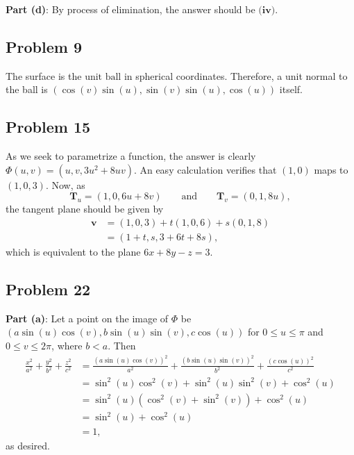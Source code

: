 \documentclass[11pt]{article}
\renewcommand{\vec}[1]{\mathbf{#1}}
\begin{document}
\textbf{Part (d)}: By process of elimination, the answer should be $\boxed{\textbf{(iv)}}$.


\subsection*{Problem 9}

The surface is the $\boxed{\text{unit ball}}$ in spherical coordinates. Therefore, a unit normal to the ball is $\boxed{(\cos(v)\sin(u), \sin(v)\sin(u), \cos(u))}$ itself.


\subsection*{Problem 15}

As we seek to parametrize a function, the answer is clearly $\Phi(u, v) = (u, v, 3u^{2} + 8uv)$. An easy calculation verifies that $(1, 0)$ maps to $(1, 0, 3)$. Now, as
\[
	\mathbf{T}_{u} = (1, 0, 6u + 8v) \qquad \text{and} \qquad \mathbf{T}_{v} = (0, 1, 8u),
\]
the tangent plane should be given by
\begin{align*}
	\vec{v} &= (1, 0, 3) + t(1, 0, 6) + s(0, 1, 8) \\
			&= (1 + t, s, 3 + 6t + 8s),
\end{align*}
which is equivalent to the plane $\boxed{6x + 8y - z = 3}$. 


\subsection*{Problem 22}

\textbf{Part (a)}: Let a point on the image of $\Phi$ be $(a \sin(u) \cos(v), b \sin(u) \sin(v), c \cos(u))$ for $0 \le u \le \pi$ and $0 \le v \le 2\pi$, where $b < a$. Then
\begin{align*}
	\frac{x^{2}}{a^{2}} + \frac{y^{2}}{b^{2}} + \frac{z^{2}}{c^{2}} &= \frac{(a \sin(u) \cos(v))^{2}}{a^{2}} + \frac{(b \sin(u) \sin(v))^{2}}{b^{2}} + \frac{(c \cos(u))^{2}}{c^{2}} \\
	&= \sin^{2}(u) \cos^{2}(v) + \sin^{2}(u) \sin^{2}(v) + \cos^{2}(u) \\
	&= \sin^{2}(u) (\cos^{2} (v) + \sin^{2}(v)) + \cos^{2}(u) \\
	&= \sin^{2}(u) + \cos^{2} (u) \\
	&= 1,
\end{align*}
as desired.
\end{document}
